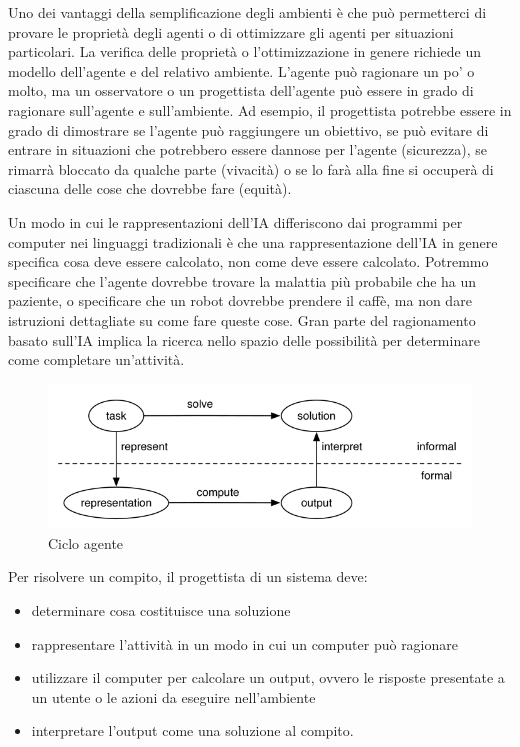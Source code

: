 \documentclass[a4paper]{extarticle}
\begin{document}
Uno dei vantaggi della semplificazione degli ambienti è che può permetterci di provare le proprietà degli agenti o di ottimizzare gli agenti per situazioni particolari. La verifica delle proprietà o l'ottimizzazione in genere richiede un modello dell'agente e del relativo ambiente. L'agente può ragionare un po' o molto, ma un osservatore o un progettista dell'agente può essere in grado di ragionare sull'agente e sull'ambiente. Ad esempio, il progettista potrebbe essere in grado di dimostrare se l'agente può raggiungere un obiettivo, se può evitare di entrare in situazioni che potrebbero essere dannose per l'agente (sicurezza), se rimarrà bloccato da qualche parte (vivacità) o se lo farà alla fine si occuperà di ciascuna delle cose che dovrebbe fare (equità).

Un modo in cui le rappresentazioni dell'IA differiscono dai programmi per computer nei linguaggi tradizionali è che una rappresentazione dell'IA in genere specifica cosa deve essere calcolato, non come deve essere calcolato. Potremmo specificare che l'agente dovrebbe trovare la malattia più probabile che ha un paziente, o specificare che un robot dovrebbe prendere il caffè, ma non dare istruzioni dettagliate su come fare queste cose. Gran parte del ragionamento basato sull'IA implica la ricerca nello spazio delle possibilità per determinare come completare un'attività.


\begin{figure}[h!]
\begin{center}
\includegraphics[scale=.65]{ruoloAgenti.png}
\caption{Ciclo agente}
\end{center}
\end{figure}
Per risolvere un compito, il progettista di un sistema deve:
\begin{itemize}
\item determinare cosa costituisce una soluzione
\item rappresentare l'attività in un modo in cui un computer può ragionare
\item utilizzare il computer per calcolare un output, ovvero le risposte presentate a un utente o le azioni da eseguire nell'ambiente
\item interpretare l'output come una soluzione al compito.
\end{itemize}
\end{document}

